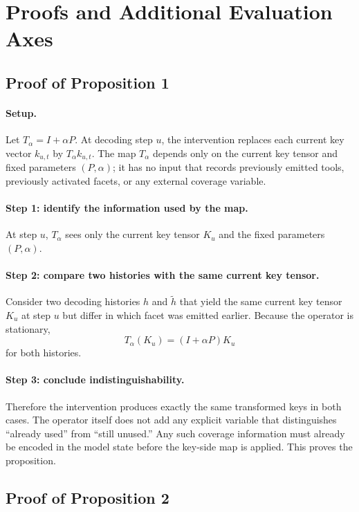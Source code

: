 \appendix
\section{Proofs and Additional Evaluation Axes}

\subsection{Proof of Proposition 1}

\paragraph{Setup.}
Let $T_{\alpha}=I+\alpha P$. At decoding step $u$, the intervention replaces each current key vector $k_{u,t}$ by $T_{\alpha}k_{u,t}$. The map $T_{\alpha}$ depends only on the current key tensor and fixed parameters $(P,\alpha)$; it has no input that records previously emitted tools, previously activated facets, or any external coverage variable.

\paragraph{Step 1: identify the information used by the map.}
At step $u$, $T_{\alpha}$ sees only the current key tensor $K_u$ and the fixed parameters $(P,\alpha)$.

\paragraph{Step 2: compare two histories with the same current key tensor.}
Consider two decoding histories $h$ and $\tilde h$ that yield the same current key tensor $K_u$ at step $u$ but differ in which facet was emitted earlier. Because the operator is stationary,
\[
T_{\alpha}(K_u)= (I+\alpha P)K_u
\]
for both histories.

\paragraph{Step 3: conclude indistinguishability.}
Therefore the intervention produces exactly the same transformed keys in both cases. The operator itself does not add any explicit variable that distinguishes ``already used'' from ``still unused.'' Any such coverage information must already be encoded in the model state before the key-side map is applied. This proves the proposition.

\subsection{Proof of Proposition 2}


